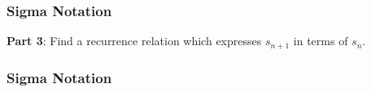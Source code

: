 \documentclass{beamer}
\begin{document}
\begin{frame}
\frametitle{Sigma Notation}
\Large
\vspace{-2.3cm}
\textbf{Part 3}: Find a recurrence relation which expresses $s_{n+1}$ in terms of $s_n$.


\end{frame}
\begin{frame}
\frametitle{Sigma Notation}
\Large
\vspace{-1cm}


\end{frame}
\end{document}
